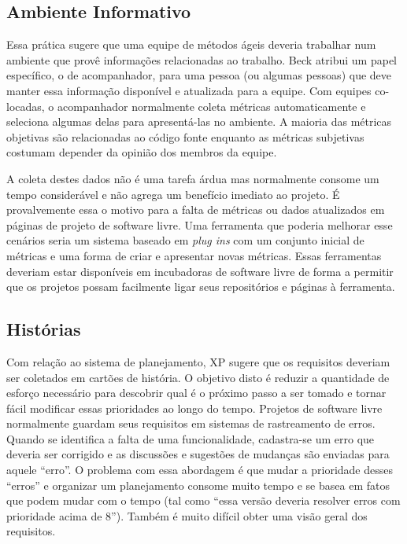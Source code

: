 \subsection{Ambiente Informativo}
\label{subsec:inform-worksp}

Essa prática sugere que uma equipe de métodos ágeis deveria trabalhar
num ambiente que provê informações relacionadas ao trabalho. Beck
\cite{XP01} atribui um papel específico, o de acompanhador, para uma
pessoa (ou algumas pessoas) que deve manter essa informação disponível
e atualizada para a equipe. Com equipes co-locadas, o acompanhador
normalmente coleta métricas \cite{Sato2007} automaticamente e
seleciona algumas delas para apresentá-las no ambiente. A maioria das
métricas objetivas são relacionadas ao código fonte enquanto as
métricas subjetivas costumam depender da opinião dos membros da
equipe.

A coleta destes dados não é uma tarefa árdua mas normalmente consome
um tempo considerável e não agrega um benefício imediato ao projeto. É
provalvemente essa o motivo para a falta de métricas ou dados
atualizados em páginas de projeto de software livre. Uma ferramenta
que poderia melhorar esse cenários seria um sistema baseado em
\emph{plug ins} com um conjunto inicial de métricas e uma forma de
criar e apresentar novas métricas. Essas ferramentas deveriam estar
disponíveis em incubadoras de software livre de forma a permitir que
os projetos possam facilmente ligar seus repositórios e páginas à
ferramenta.

\subsection{Histórias}
\label{subsec:stories}

Com relação ao sistema de planejamento, XP sugere que os requisitos
deveriam ser coletados em cartões de história. O objetivo disto é
reduzir a quantidade de esforço necessário para descobrir qual é o
próximo passo a ser tomado e tornar fácil modificar essas prioridades
ao longo do tempo. Projetos de software livre normalmente guardam seus
requisitos em sistemas de rastreamento de erros. Quando se identifica
a falta de uma funcionalidade, cadastra-se um erro que deveria ser
corrigido e as discussões e sugestões de mudanças são enviadas para
aquele ``erro''. O problema com essa abordagem é que mudar a
prioridade desses ``erros'' e organizar um planejamento consome muito
tempo e se basea em fatos que podem mudar com o tempo (tal como ``essa
versão deveria resolver erros com prioridade acima de 8''). Também é
muito difícil obter uma visão geral dos requisitos.

